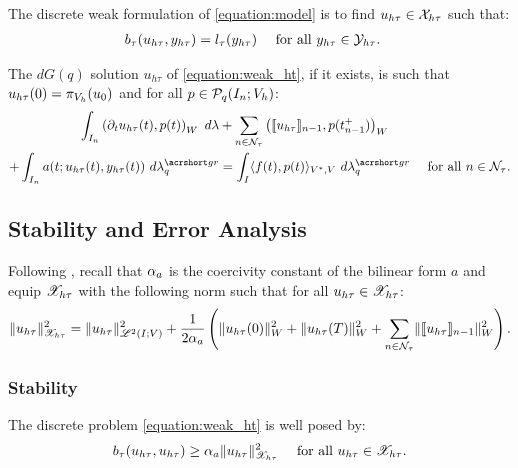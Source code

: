 \begin{definition}
    The discrete weak formulation of \cref{equation:model} is to find $u_{h \tau} \in \mathcal{X}_{h \tau}$ such that:
    \begin{align} \label{equation:weak_ht}
        b_{\tau}(u_{h \tau}, y_{h \tau}) &= l_{\tau}(y_{h \tau}) &\text{ for all } y_{h \tau} \in \mathcal{Y}_{h \tau}.
&    \end{align}
\end{definition}

\begin{proposition}[Localization]
    The $dG(q)$ solution $u_{h \tau}$ of \cref{equation:weak_ht}, if it exists, is such that $u_{h \tau}(0) = \pi_{V_h}(u_0)$ and for all $p \in \mathcal{P}_{q}(I_n; V_h)$:
    \begin{align}
        \int_{I_n} \left( \partial_t u_{h \tau}(t), p(t) \right)_W ~ d \lambda & + \sum_{n \in \TimeIndices} \left( \llbracket u_{h \tau} \rrbracket_{n - 1}, p(t_{n - 1}^+) \right)_W \notag \\
        + \int_{I_n} a(t; u_{h \tau}(t), y_{h \tau}(t)) ~ d \lambdaGR_q & = \int_I \langle f(t), p(t) \rangle_{V^*, V} ~ d \lambdaGR_q &\text{ for all } n \in \TimeIndices.
    \end{align}
\end{proposition}

\newpage
\subsection{Stability and Error Analysis}

Following \cite[p.~186]{Ern2021}, recall that $\alpha_{a}$ is the coercivity constant of the bilinear form $a$ and equip $\mathscr{X}_{h \tau}$ with the following norm such that for all $u_{h \tau} \in \mathscr{X}_{h \tau}$:
\begin{align}
    \lVert u_{h \tau} \rVert_{\mathscr{X}_{h \tau}}^2 = \lVert u_{h \tau} \rVert_{\mathscr{L}^{2}(I; V)}^2 + \frac{1}{2 \alpha_{a}} \left( \lVert u_{h \tau}(0) \rVert_W^2 + \lVert u_{h \tau}(T) \rVert_W^2 + \sum_{n \in \mathcal{N}_{\tau}} \lVert \llbracket u_{h \tau} \rrbracket_{n - 1} \rVert_W^2 \right).
\end{align}

\subsubsection{Stability}

\begin{lemma}[Coercivity]
    The discrete problem \cref{equation:weak_ht} is well posed by:
    \begin{align}
        b_{\tau}(u_{h \tau}, u_{h \tau}) &\geq \alpha_{a} \lVert u_{h \tau} \rVert_{\mathscr{X}_{h \tau}}^2 &\text{ for all } u_{h \tau} \in \mathscr{X}_{h \tau}.
    \end{align}
\end{lemma}


